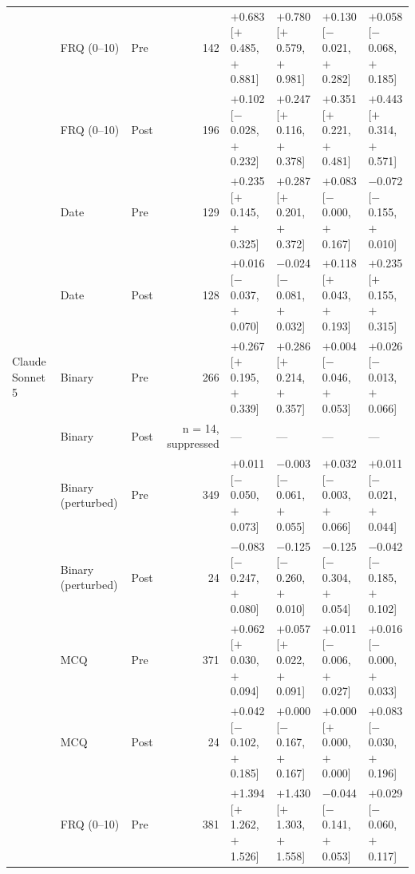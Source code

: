 \begin{table}[p]
\begin{tabular}{l l l r l l l l}
 & FRQ (0--10) & Pre & 142 & $+$0.683 {\scriptsize[$+$0.485, $+$0.881]} & $+$0.780 {\scriptsize[$+$0.579, $+$0.981]} & $+$0.130 {\scriptsize[$-$0.021, $+$0.282]} & $+$0.058 {\scriptsize[$-$0.068, $+$0.185]} \\
 & FRQ (0--10) & Post & 196 & $+$0.102 {\scriptsize[$-$0.028, $+$0.232]} & $+$0.247 {\scriptsize[$+$0.116, $+$0.378]} & $+$0.351 {\scriptsize[$+$0.221, $+$0.481]} & $+$0.443 {\scriptsize[$+$0.314, $+$0.571]} \\
 & Date & Pre & 129 & $+$0.235 {\scriptsize[$+$0.145, $+$0.325]} & $+$0.287 {\scriptsize[$+$0.201, $+$0.372]} & $+$0.083 {\scriptsize[$-$0.000, $+$0.167]} & $-$0.072 {\scriptsize[$-$0.155, $+$0.010]} \\
 & Date & Post & 128 & $+$0.016 {\scriptsize[$-$0.037, $+$0.070]} & $-$0.024 {\scriptsize[$-$0.081, $+$0.032]} & $+$0.118 {\scriptsize[$+$0.043, $+$0.193]} & $+$0.235 {\scriptsize[$+$0.155, $+$0.315]} \\
\addlinespace
Claude Sonnet 5 & Binary & Pre & 266 & $+$0.267 {\scriptsize[$+$0.195, $+$0.339]} & $+$0.286 {\scriptsize[$+$0.214, $+$0.357]} & $+$0.004 {\scriptsize[$-$0.046, $+$0.053]} & $+$0.026 {\scriptsize[$-$0.013, $+$0.066]} \\
 & Binary & Post & n = 14, suppressed & --- & --- & --- & --- \\
 & Binary (perturbed) & Pre & 349 & $+$0.011 {\scriptsize[$-$0.050, $+$0.073]} & $-$0.003 {\scriptsize[$-$0.061, $+$0.055]} & $+$0.032 {\scriptsize[$-$0.003, $+$0.066]} & $+$0.011 {\scriptsize[$-$0.021, $+$0.044]} \\
 & Binary (perturbed) & Post & 24 & $-$0.083 {\scriptsize[$-$0.247, $+$0.080]} & $-$0.125 {\scriptsize[$-$0.260, $+$0.010]} & $-$0.125 {\scriptsize[$-$0.304, $+$0.054]} & $-$0.042 {\scriptsize[$-$0.185, $+$0.102]} \\
 & MCQ & Pre & 371 & $+$0.062 {\scriptsize[$+$0.030, $+$0.094]} & $+$0.057 {\scriptsize[$+$0.022, $+$0.091]} & $+$0.011 {\scriptsize[$-$0.006, $+$0.027]} & $+$0.016 {\scriptsize[$-$0.000, $+$0.033]} \\
 & MCQ & Post & 24 & $+$0.042 {\scriptsize[$-$0.102, $+$0.185]} & $+$0.000 {\scriptsize[$-$0.167, $+$0.167]} & $+$0.000 {\scriptsize[$+$0.000, $+$0.000]} & $+$0.083 {\scriptsize[$-$0.030, $+$0.196]} \\
 & FRQ (0--10) & Pre & 381 & $+$1.394 {\scriptsize[$+$1.262, $+$1.526]} & $+$1.430 {\scriptsize[$+$1.303, $+$1.558]} & $-$0.044 {\scriptsize[$-$0.141, $+$0.053]} & $+$0.029 {\scriptsize[$-$0.060, $+$0.117]} \\

\end{tabular}
\end{table}
